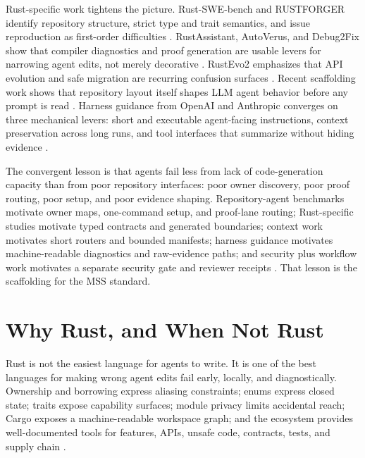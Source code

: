 \documentclass[conference]{IEEEtran}
\newcommand{\mss}{\textnormal{\textsc{MSS}}}
\begin{document}
Rust-specific work tightens the picture. Rust-SWE-bench and RUSTFORGER identify repository structure, strict type and trait semantics, and issue reproduction as first-order difficulties \cite{rustSweBench2026}. RustAssistant, AutoVerus, and Debug2Fix show that compiler diagnostics and proof generation are usable levers for narrowing agent edits, not merely decorative \cite{rustAssistant2025,autoVerus2024,debug2Fix2026}. RustEvo2 emphasizes that API evolution and safe migration are recurring confusion surfaces \cite{rustEvo2025}. Recent scaffolding work shows that repository layout itself shapes LLM agent behavior before any prompt is read \cite{insideScaffold2026}. Harness guidance from OpenAI and Anthropic converges on three mechanical levers: short and executable agent-facing instructions, context preservation across long runs, and tool interfaces that summarize without hiding evidence \cite{openaiHarness2026,openaiAgents2026,anthropicTools2025}.

The convergent lesson is that agents fail less from lack of code-generation capacity than from poor repository interfaces: poor owner discovery, poor proof routing, poor setup, and poor evidence shaping. Repository-agent benchmarks motivate owner maps, one-command setup, and proof-lane routing; Rust-specific studies motivate typed contracts and generated boundaries; context work motivates short routers and bounded manifests; harness guidance motivates machine-readable diagnostics and raw-evidence paths; and security plus workflow work motivates a separate security gate and reviewer receipts \cite{sweAgent2024,rustSweBench2026,contextBench2026,openaiHarness2026,susvibes2025,professionalControl2025}. That lesson is the scaffolding for the \mss{} standard.

\section{Why Rust, and When Not Rust}
\label{sec:why-rust}
Rust is not the easiest language for agents to write. It is one of the best languages for making wrong agent edits fail early, locally, and diagnostically. Ownership and borrowing express aliasing constraints; enums express closed state; traits expose capability surfaces; module privacy limits accidental reach; Cargo exposes a machine-readable workspace graph; and the ecosystem provides well-documented tools for features, APIs, unsafe code, contracts, tests, and supply chain \cite{rustApiGuidelines2026,cargoWorkspaces2026,cargoMetadata2026}.
\end{document}
